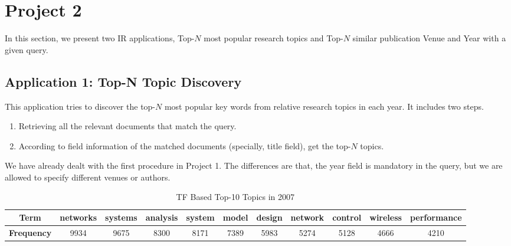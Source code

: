 \section{Project 2}\label{sec:proj2}

In this section, we present two IR applications, Top-$N$ most popular research topics and Top-$N$ similar publication Venue and Year with a given query.

\subsection{Application 1: Top-N Topic Discovery}

This application tries to discover the top-$N$ most popular key words from relative research topics in each year. It includes two steps.
\begin{enumerate}
	\item Retrieving all the relevant documents that match the query.
	\item According to field information of the matched documents (specially, \textsf{title} field), get the top-$N$ topics.\end{enumerate}

We have already dealt with the first procedure in Project 1. The differences are that, the \textsf{year} field is mandatory in the query, but we are allowed to specify different \textsf{venue}s or \textsf{authors}.

\begin{table*}[!ht]
\caption{TF Based Top-10 Topics in 2007}\label{tbl:a1-tf-res}
\small
\centering
\begin{tabular}{|c|c|c|c|c|c|c|c|c|c|c|}
\hline
\textbf{Term}      & networks & systems & analysis & system & model & design & network & control & wireless & performance \\ \hline
\textbf{Frequency} & 9934     & 9675    & 8300     & 8171   & 7389  & 5983   & 5274    & 5128    & 4666     & 4210     \\  \hline
\end{tabular}
\end{table*}

